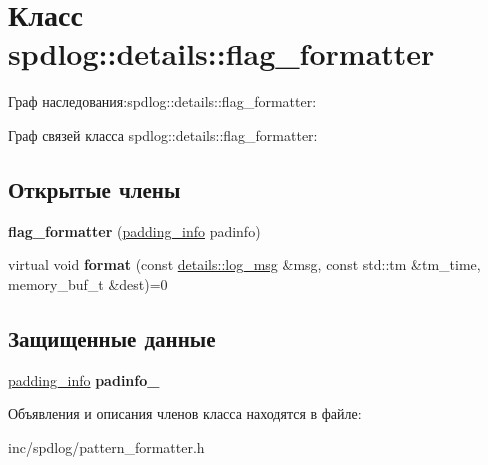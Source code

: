 \hypertarget{classspdlog_1_1details_1_1flag__formatter}{}\section{Класс spdlog\+:\+:details\+:\+:flag\+\_\+formatter}
\label{classspdlog_1_1details_1_1flag__formatter}


Граф наследования\+:spdlog\+:\+:details\+:\+:flag\+\_\+formatter\+:


Граф связей класса spdlog\+:\+:details\+:\+:flag\+\_\+formatter\+:
\subsection*{Открытые члены}
\begin{DoxyCompactItemize}
\item 
\mbox{\label{classspdlog_1_1details_1_1flag__formatter_a7f775ab8ad4027546c3490f2f299bf43}} 
{\bfseries flag\+\_\+formatter} (\hyperlink{structspdlog_1_1details_1_1padding__info}{padding\+\_\+info} padinfo)
\item 
\mbox{\label{classspdlog_1_1details_1_1flag__formatter_acd51bf0e7c797d7b88807b50bb7786f1}} 
virtual void {\bfseries format} (const \hyperlink{structspdlog_1_1details_1_1log__msg}{details\+::log\+\_\+msg} \&msg, const std\+::tm \&tm\+\_\+time, memory\+\_\+buf\+\_\+t \&dest)=0
\end{DoxyCompactItemize}
\subsection*{Защищенные данные}
\begin{DoxyCompactItemize}
\item 
\mbox{\label{classspdlog_1_1details_1_1flag__formatter_a80f1166212df85f665d87f2826240567}} 
\hyperlink{structspdlog_1_1details_1_1padding__info}{padding\+\_\+info} {\bfseries padinfo\+\_\+}
\end{DoxyCompactItemize}


Объявления и описания членов класса находятся в файле\+:\begin{DoxyCompactItemize}
\item 
inc/spdlog/pattern\+\_\+formatter.\+h\end{DoxyCompactItemize}
